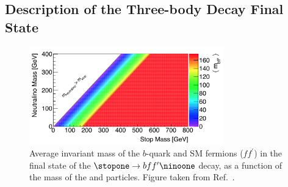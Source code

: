 %

\subsection{Description of the Three-body Decay Final State}
\label{sec:stop_final_state}

\begin{figure}[!htb]
    \begin{center}
        \includegraphics[width=0.75\textwidth]{figures/search_stop2l/nachman_stop_phase_space}
        \caption{
            Average invariant mass of the $b$-quark and SM fermions ($f f^{\prime}$) in the
            final state of the $\stopone \rightarrow b f f^{\prime} \ninoone$ decay, as a function of the mass
            of the \stopone and \ninoone particles.
            Figure taken from Ref.~\cite{Nachman:2016qyc}.
        }
        \label{fig:stop_phase_space}
    \end{center}
\end{figure}

